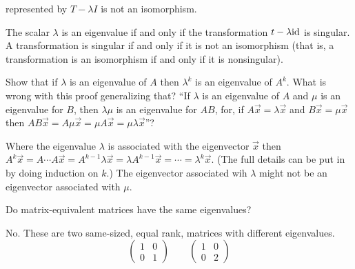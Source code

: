 \begin{exercises}
    represented by \( T-\lambda I \) is not an isomorphism.
    \begin{answer}
      The scalar $\lambda$ is an eigenvalue if and only if the transformation
      $t-\lambda \mbox{id}$ is singular.
      A transformation is singular if and only if it is not an isomorphism
      (that is, a transformation is an isomorphism if and only if it is
      nonsingular).
    \end{answer}
  \item \cite{Strang} 
    \begin{exparts}
      \partsitem Show that if \( \lambda \) is an eigenvalue of \( A \)
         then \( \lambda^k \) is an eigenvalue of \( A^k \).
      \partsitem What is wrong with this proof generalizing that?
         ``If \( \lambda \) is an eigenvalue of \( A \) and \( \mu \) is
         an eigenvalue for \( B \), then \( \lambda\mu \) is an eigenvalue
         for \( AB \), for, if \( A\vec{x}=\lambda\vec{x} \) and
         \( B\vec{x}=\mu\vec{x} \) then
         \( AB\vec{x}=A\mu\vec{x}=\mu A\vec{x}=\mu\lambda\vec{x} \)''?
    \end{exparts}
    \begin{answer}
      \begin{exparts}
        \partsitem Where the eigenvalue $\lambda$ is associated with the
          eigenvector $\vec{x}$ then
          $A^k\vec{x}=A\cdots A\vec{x}=A^{k-1}\lambda\vec{x}
            =\lambda A^{k-1}\vec{x}=\cdots=\lambda^k\vec{x}$.
          (The full details can be put in by doing induction on $k$.)
        \partsitem The eigenvector associated wih $\lambda$
          might not be an eigenvector associated with $\mu$.
      \end{exparts}
    \end{answer}
  \item 
    Do matrix-equivalent matrices have the same eigenvalues?
    \begin{answer}
      No.
      These are two same-sized, equal rank, matrices
      with different eigenvalues.
      \begin{equation*}
        \begin{pmatrix}
          1  &0  \\
          0  &1
        \end{pmatrix}
        \qquad
        \begin{pmatrix}
          1  &0  \\
          0  &2
        \end{pmatrix}
      \end{equation*}

\end{answer}
\end{exercises}
